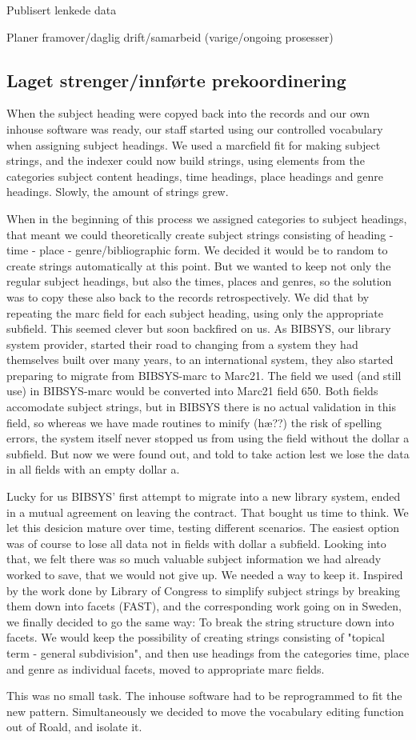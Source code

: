 Publisert lenkede data

Planer framover/daglig drift/samarbeid (varige/ongoing prosesser)

\subsection{Laget strenger/innførte prekoordinering}

When the subject heading were copyed back into the records and our own inhouse software was ready, our staff started using our controlled vocabulary when assigning subject headings. We used a marcfield fit for making subject strings, and the indexer could now build strings, using elements from the categories subject content headings, time headings, place headings and genre headings. Slowly, the amount of strings grew. 

When in the beginning of this process we assigned categories to subject headings, that meant we could theoretically create subject strings consisting of heading - time - place - genre/bibliographic form. We decided it would be to random to create strings automatically at this point. But we wanted to keep not only the regular subject headings, but also the times, places and genres, so the solution was to copy these also back to the records retrospectively. We did that by repeating the marc field for each subject heading, using only the appropriate subfield. This seemed clever but soon backfired on us. As BIBSYS, our library system provider, started their road to changing from a system they had themselves built over many years, to an international system, they also started preparing to migrate from BIBSYS-marc to Marc21. The field we used (and still use) in BIBSYS-marc would be converted into Marc21 field 650. Both fields accomodate subject strings, but in BIBSYS there is no actual validation in this field, so whereas we have made routines to minify (hæ??) the risk of spelling errors, the system itself never stopped us from using the field without the dollar a subfield. But now we were found out, and told to take action lest we lose the data in all fields with an empty dollar a. 

Lucky for us BIBSYS' first attempt to migrate into a new library system, ended in a mutual agreement on leaving the contract. That bought us time to think. We let this desicion mature over time, testing different scenarios. The easiest option was of course to lose all data not in fields with dollar a subfield. Looking into that, we felt there was so much valuable subject information we had already worked to save, that we would not give up. We needed a way to keep it. Inspired by the work done by Library of Congress to simplify subject strings by breaking them down into facets (FAST), and the corresponding work going on in Sweden, we finally decided to go the same way: To break the string structure down into facets. We would keep the possibility of creating strings consisting of "topical term - general subdivision", and then use headings from the categories time, place and genre as individual facets, moved to appropriate marc fields. 

This was no small task. The inhouse software had to be reprogrammed to fit the new pattern. Simultaneously we decided to move the vocabulary editing function out of Roald, and isolate it. 